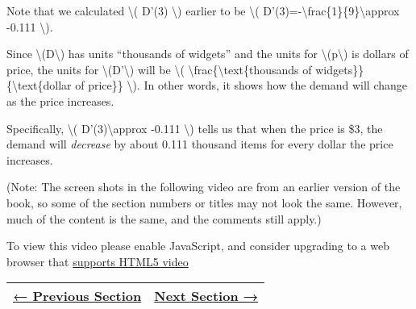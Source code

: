 Note that we calculated \textbackslash{}( D'(3) \textbackslash{})
earlier to be \textbackslash{}(
D'(3)=-\textbackslash{}frac\{1\}\{9\}\textbackslash{}approx -0.111
\textbackslash{}).

Since \textbackslash{}(D\textbackslash{}) has units ``thousands of
widgets'' and the units for \textbackslash{}(p\textbackslash{}) is
dollars of price, the units for \textbackslash{}(D'\textbackslash{})
will be \textbackslash{}(
\textbackslash{}frac\{\textbackslash{}text\{thousands of
widgets\}\}\{\textbackslash{}text\{dollar of price\}\}
\textbackslash{}). In other words, it shows how the demand will change
as the price increases.

Specifically, \textbackslash{}( D'(3)\textbackslash{}approx -0.111
\textbackslash{}) tells us that when the price is \$3, the demand will
\emph{decrease} by about 0.111 thousand items for every dollar the price
increases.

(Note: The screen shots in the following video are from an earlier
version of the book, so some of the section numbers or titles may not
look the same. However, much of the content is the same, and the
comments still apply.)

To view this video please enable JavaScript, and consider upgrading to a
web browser that \href{http://videojs.com/html5-video-support/}{supports
HTML5 video}

\begin{longtable}[]{@{}ll@{}}
\toprule
\endhead
\href{section2-1.php}{← Previous Section} & \href{section2-3.php}{Next
Section →}\tabularnewline
\bottomrule
\end{longtable}
